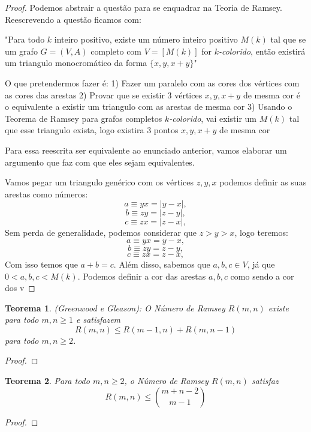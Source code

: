 \documentclass{article}
\newtheorem{teor}{Teorema}[section]
\begin{document}
\begin{proof}
    Podemos abstrair a questão para se enquadrar na Teoria de Ramsey. Reescrevendo a questão ficamos com:

    "Para todo $k$ inteiro positivo, existe um número inteiro positivo $M(k)$ tal que se um grafo $G = (V, A)$ completo com $V = [M(k)]$ for $k$\emph{-colorido}, então existirá um triangulo monocromático da forma $\{x, y, x+y\}$"

    O que pretendermos fazer é:
    1) Fazer um paralelo com as cores dos vértices com as cores das arestas
    2) Provar que se existir 3 vértices $x, y, x+y$ de mesma cor é o equivalente a existir um triangulo com as arestas de mesma cor
    3) Usando o Teorema de Ramsey para grafos completos $k$\emph{-colorido}, vai existir um $M(k)$ tal que esse triangulo exista, logo existira 3 pontos $x, y, x+y$ de mesma cor

    Para essa reescrita ser equivalente ao enunciado anterior, vamos elaborar um argumento que faz com que eles sejam equivalentes.

    Vamos pegar um triangulo genérico com os vértices $z, y, x$ podemos definir as suas arestas como números:
    \[a \equiv yx = |y-x|,\]
    \[b \equiv zy = |z-y|,\]
    \[c \equiv zx = |z-x|,\]
    Sem perda de generalidade, podemos considerar que $z > y > x$, logo teremos:
    \[a \equiv yx = y-x,\]
    \[b \equiv zy = z-y,\]
    \[c \equiv zx = z-x,\]
    Com isso temos que $a + b = c$.
    Além disso, sabemos que $a, b, c \in V$, já que $0 < a, b, c < M(k)$. Podemos definir a cor das arestas $a,b,c$ como sendo a cor dos v
\end{proof}


\begin{teor}
    (Greenwood e Gleason):
    O Número de Ramsey  $R(m, n)$ existe para todo $m,n \geq 1$ e satisfazem
    \[R(m, n) \leq R(m-1, n) + R(m, n-1)\]
    para todo $m,n \geq 2$.
\end{teor}

\begin{proof}

\end{proof}


\begin{teor}
    Para todo $m,n \geq 2$, o Número de Ramsey  $R(m, n)$ satisfaz
    \[R(m, n) \leq \binom{m+n-2}{m-1}\]
\end{teor}

\begin{proof}

\end{proof}
\end{document}
